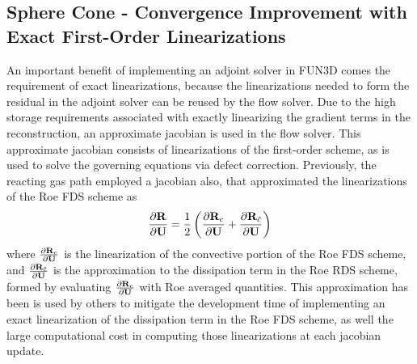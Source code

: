 \subsection{Sphere Cone - Convergence Improvement with Exact First-Order Linearizations}

An important benefit of implementing an adjoint solver in FUN3D comes the
requirement of exact linearizations, because the linearizations needed to form
the residual in the adjoint solver can be reused by the flow solver.
Due to the high storage requirements associated with exactly linearizing the
gradient terms in the reconstruction, an approximate jacobian is used in the
flow solver.  This approximate jacobian consists of linearizations of the
first-order scheme, as is used to solve the governing equations via defect
correction.  Previously, the reacting gas path employed a jacobian also, that
approximated the linearizations of the Roe FDS scheme\cite{gnoffo-tp} as
\begin{equation}
  \frac{\partial \mathbf R_{}}{\partial \mathbf U} = 
  \frac{1}{2} \left( \frac{\partial \mathbf R_{c}}{\partial \mathbf U} + \frac{\partial \mathbf R_{\tilde{c}}}{\partial \mathbf U} \right)
  \label{approx-roe-jac}
\end{equation}
where $\frac{\partial \mathbf R_{c}}{\partial \mathbf U}$ is the linearization of the convective portion of the Roe
FDS scheme, and $\frac{\partial \mathbf R_{\tilde{c}}}{\partial \mathbf U}$ is the approximation to the dissipation
term in the Roe RDS scheme, formed by evaluating $\frac{\partial \mathbf R_{c}}{\partial \mathbf U}$ with Roe
averaged quantities.  This approximation has been is used by others
\cite{rinaldi2014exact} to mitigate the development time of implementing an
exact linearization of the dissipation term in the Roe FDS scheme, as well the
large computational cost in computing those linearizations at each jacobian
update.

